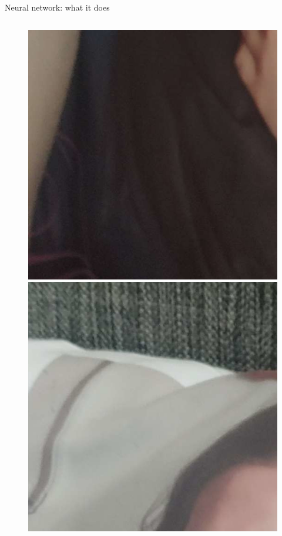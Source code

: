 \documentclass{beamer}
\begin{document}
\begin{frame}{Neural network: what it does}
\begin{columns}
\begin{column}{0.05\textwidth}
\begin{figure}
                \includegraphics[width=\linewidth]{distorted/distorted-0-3}
                \includegraphics[width=\linewidth]{distorted/distorted-1-0}

\end{figure}
\end{column}
\end{columns}
\end{frame}
\end{document}

